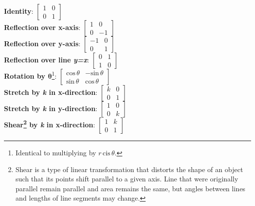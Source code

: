 \documentclass[12pt, letterpaper]{article}
\begin{document}
\textbf{Identity}: \(
\begin{bmatrix} 
1 & 0 \\ 
0 & 1 
\end{bmatrix}\)\vspace{1em}\\

\textbf{Reflection over x-axis}: \(
\begin{bmatrix} 
1 & 0 \\ 
0 & -1 
\end{bmatrix}\)\vspace{1em}\\

\textbf{Reflection over y-axis}: \(
\begin{bmatrix} 
-1 & 0 \\ 
0 & 1 
\end{bmatrix}\)\vspace{1em}\\

\textbf{Reflection over line \textit{y=x}}: \(
\begin{bmatrix} 
0 & 1 \\ 
1 & 0 
\end{bmatrix}\)\vspace{1em}\\

\textbf{Rotation by \(\boldsymbol{\theta}\)}\footnote{Identical to multiplying by \(r \, \text{cis} \, \theta\).}: \(
\begin{bmatrix} 
\text{cos}\,\theta & -\text{sin}\,\theta \\ 
\text{sin}\,\theta & \text{cos}\,\theta 
\end{bmatrix}\)\vspace{1em}\\

\textbf{Stretch by \textit{k} in x-direction}: \(
\begin{bmatrix} 
k & 0 \\ 
0 & 1 
\end{bmatrix}\)\vspace{1em}\\

\textbf{Stretch by \textit{k} in y-direction}: \(
\begin{bmatrix} 
1 & 0 \\ 
0 & k 
\end{bmatrix}\)\vspace{1em}\\

\textbf{Shear\footnote{Shear is a type of linear transformation that distorts the shape of an object such that its points shift parallel to a given axis. Line that were originally parallel remain parallel and area remains the same, but angles between lines and lengths of line segments may change.} by \textit{k} in x-direction}: \(
\begin{bmatrix} 
1 & k \\ 
0 & 1 
\end{bmatrix}\)\vspace{1em}\\
\end{document}
